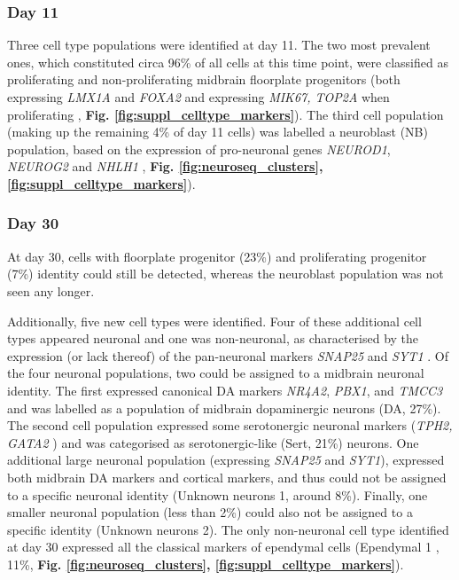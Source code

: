 \subsubsection{Day 11}

Three cell type populations were identified at day 11.
The two most prevalent ones, which constituted circa 96\% of all cells at this time point, were classified as proliferating and non-proliferating midbrain floorplate progenitors (both expressing \textit{LMX1A} and \textit{FOXA2} and expressing \textit{MIK67, TOP2A} when proliferating \cite{la2016molecular}, \textbf{Fig. \ref{fig:suppl_celltype_markers}}).
The third cell population (making up the remaining 4\% of day 11 cells) was labelled a neuroblast (NB) population, based on the expression of pro-neuronal genes \textit{NEUROD1}, \textit{NEUROG2} and \textit{NHLH1} \cite{bertrand2002proneural, lacomme2012neurog2}, \textbf{Fig. \ref{fig:neuroseq_clusters}, \ref{fig:suppl_celltype_markers}}).

\subsubsection{Day 30}

At day 30, cells with floorplate progenitor (23\%) and proliferating progenitor (7\%) identity could still be detected, whereas the neuroblast population was not seen any longer.

Additionally, five new cell types were identified.
Four of these additional cell types appeared neuronal and one was non-neuronal, as characterised by the expression (or lack thereof) of the pan-neuronal markers \textit{SNAP25} and \textit{SYT1} \cite{arenas2015make}.
Of the four neuronal populations, two could be assigned to a midbrain neuronal identity.
The first expressed canonical DA markers \textit{NR4A2}, \textit{PBX1}, and \textit{TMCC3} \cite{la2016molecular, park2006acquisition, ramonet2012park9} and was labelled as a population of midbrain dopaminergic neurons (DA, 27\%).
The second cell population expressed some serotonergic neuronal markers (\textit{TPH2, GATA2} \cite{cummings2019serotonergic}) and was categorised as serotonergic-like (Sert, 21\%) neurons. 
One additional large neuronal population (expressing \textit{SNAP25} and \textit{SYT1}), expressed both midbrain DA markers and cortical markers,
and thus could not be assigned to a specific neuronal identity (Unknown neurons 1, around 8\%).
Finally, one smaller neuronal population (less than 2\%) could also not be assigned to a specific identity (Unknown neurons 2). 
The only non-neuronal cell type identified at day 30 expressed all the classical markers of ependymal cells (Ependymal 1 \cite{campbell2017molecular}, 11\%,\textbf{ Fig. \ref{fig:neuroseq_clusters}, \ref{fig:suppl_celltype_markers}}). 

